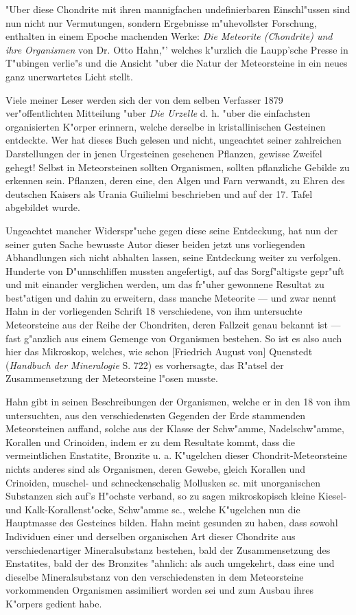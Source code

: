 \documentclass[a4paper, 11pt, oneside]{article}
\begin{document}
"Uber diese Chondrite mit ihren mannigfachen undefinierbaren Einschl"ussen sind nun nicht nur Vermutungen, sondern Ergebnisse m"uhevollster Forschung, enthalten in einem Epoche machenden Werke: \emph{Die Meteorite (Chondrite) und ihre Organismen} von Dr. Otto Hahn,"' welches k"urzlich die Laupp'sche Presse in T"ubingen verlie"s und die Ansicht "uber die Natur der Meteorsteine in ein neues ganz unerwartetes Licht stellt.

Viele meiner Leser werden sich der von dem selben Verfasser 1879 ver"offentlichten Mitteilung "uber \emph{Die Urzelle} d. h. "uber die einfachsten organisierten K"orper erinnern, welche derselbe in kristallinischen Gesteinen entdeckte. Wer hat dieses Buch gelesen und nicht, ungeachtet seiner zahlreichen Darstellungen der in jenen Urgesteinen gesehenen Pflanzen, gewisse Zweifel gehegt! Selbst in Meteorsteinen sollten Organismen, sollten pflanzliche Gebilde zu erkennen sein. Pflanzen, deren eine, den Algen und Farn verwandt, zu Ehren des deutschen Kaisers als Urania Guilielmi beschrieben und auf der 17. Tafel abgebildet wurde.

Ungeachtet mancher Widerspr"uche gegen diese seine Entdeckung, hat nun der seiner guten Sache bewusste Autor dieser beiden jetzt uns vorliegenden Abhandlungen sich nicht abhalten lassen, seine Entdeckung weiter zu verfolgen. Hunderte von D"unnschliffen mussten angefertigt, auf das Sorgf"altigste gepr"uft und mit einander verglichen werden, um das fr"uher gewonnene Resultat zu best"atigen und dahin zu erweitern, dass manche Meteorite --- und zwar nennt Hahn in der vorliegenden Schrift 18 verschiedene, von ihm untersuchte Meteorsteine aus der Reihe der Chondriten, deren Fallzeit genau bekannt ist --- fast g"anzlich aus einem Gemenge von Organismen bestehen. So ist es also auch hier das Mikroskop, welches, wie schon [Friedrich August von] Quenstedt (\emph{Handbuch der Mineralogie} S. 722) es vorhersagte, das R"atsel der Zusammensetzung der Meteorsteine l"osen musste.

Hahn gibt in seinen Beschreibungen der Organismen, welche er in den 18 von ihm untersuchten, aus den verschiedensten Gegenden der Erde stammenden Meteorsteinen auffand, solche aus der Klasse der Schw"amme, Nadelschw"amme, Korallen und Crinoiden, indem er zu dem Resultate kommt, dass die vermeintlichen Enstatite, Bronzite u. a. K"ugelchen dieser Chondrit-Meteorsteine nichts anderes sind als Organismen, deren Gewebe, gleich Korallen und Crinoiden, muschel- und schneckenschalig Mollusken sc. mit unorganischen Substanzen sich auf's H"ochste verband, so zu sagen mikroskopisch kleine Kiesel- und Kalk-Korallenst"ocke, Schw"amme sc., welche K"ugelchen nun die Hauptmasse des Gesteines bilden. Hahn meint gesunden zu haben, dass sowohl Individuen einer und derselben organischen Art dieser Chondrite aus verschiedenartiger Mineralsubstanz bestehen, bald der Zusammensetzung des Enstatites, bald der des Bronzites "ahnlich: als auch umgekehrt, dass eine und dieselbe Mineralsubstanz von den verschiedensten in dem Meteorsteine vorkommenden Organismen assimiliert worden sei und zum Ausbau ihres K"orpers gedient habe.
\end{document}
